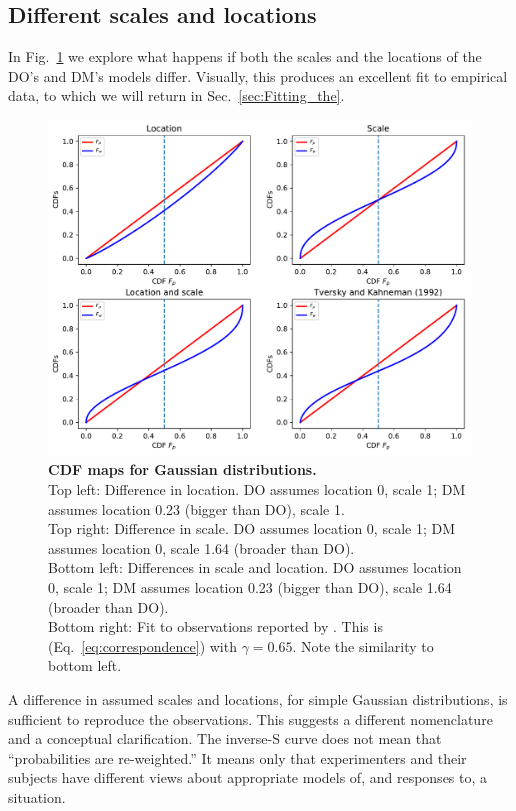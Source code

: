 \documentclass[%
	a4paper,
	abstract=true,	
	12pt,
	numbers=noenddot,
]{scrartcl}
\newcommand{\eref}[1]{(Eq.~\ref{eq:#1})}
\newcommand{\flabel}[1]{\label{fig:#1}}
\newcommand{\fref}[1]{Fig.~\ref{fig:#1}}
\newcommand{\seclabel}[1]{\label{sec:#1}}
\newcommand{\secref}[1]{Sec.~\ref{sec:#1}}
\begin{document}
\subsection{Different scales and locations\seclabel{A_mismatch}}
In \fref{Gauss_scale_location_both_KT} we explore what happens if both the scales and the locations of the DO's and DM's models differ. Visually, this produces an excellent fit to empirical data, to which we will return in \secref{Fitting_the}.
\begin{figure}
\centering
\includegraphics[width=1.0\textwidth]{./figs/Gauss_scale_location_both_KT.pdf}
\caption{\textbf{CDF maps for Gaussian distributions.}\\
Top left: Difference in location. DO assumes location 0, scale 1; DM assumes location 0.23 (bigger than DO), scale 1.\\
Top right: Difference in scale. DO assumes location 0, scale 1; DM assumes location 0, scale 1.64 (broader than DO).\\
Bottom left: Differences in scale and location. DO assumes location 0, scale 1; DM assumes location 0.23 (bigger than DO), scale 1.64 (broader than DO).\\
Bottom right: Fit to observations reported by \textcite{TverskyKahneman1992}. This is \eref{correspondence} with $\gamma=0.65$.
Note the similarity to bottom left.}
\flabel{Gauss_scale_location_both_KT}
\end{figure}
A difference in assumed scales and locations, for simple Gaussian distributions, is sufficient to reproduce the observations. This suggests a different nomenclature and a conceptual clarification. The inverse-S curve does not mean that ``probabilities are re-weighted.'' It means only that experimenters and their subjects have different views about appropriate models of, and responses to, a situation.
\end{document}
